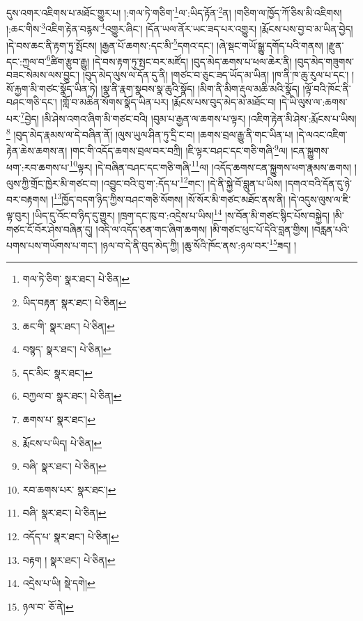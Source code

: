 དུས་འགར་འཇིགས་པ་མཐོང་གྱུར་པ། །:གལ་ཏེ་གཅིག་\footnote{གལ་ཏེ་ཅིག་  སྣར་ཐང་།  པེ་ཅིན། }ལ་:ཡིད་རྟོན་\footnote{ཡིད་བརྟན་  སྣར་ཐང་།  པེ་ཅིན། }ན། །གཅིག་ལ་ཁྱོད་ཀོ་ཅིས་མི་འཇིགས། །:ཆང་གིས་\footnote{ཆང་གི་  སྣར་ཐང་།  པེ་ཅིན། }འཇིག་རྟེན་བརྙས་\footnote{བསྙད་  སྣར་ཐང་།  པེ་ཅིན། }འགྱུར་ཞིང་། །དོན་ཡལ་ནོར་ཡང་ཟད་པར་འགྱུར། །རྨོངས་པས་བྱ་བ་མ་ཡིན་བྱེད། །དེ་བས་ཆང་ནི་རྟག་ཏུ་སྤོངས། །རྒྱན་པོ་ཆགས་:དང་མི་\footnote{དང་མིང་  སྣར་ཐང་། }དགའ་དང་། །ཞེ་སྡང་གཡོ་སྒྱུ་དགོད་པའི་གནས། །རྫུན་དང་:ཀྱལ་བ་\footnote{བཀྱལ་བ་  སྣར་ཐང་།  པེ་ཅིན། }ཚིག་རྩུབ་རྒྱུ། །དེ་བས་རྟག་ཏུ་སྤང་བར་མཛོད། །བུད་མེད་ཆགས་པ་ཕལ་ཆེར་ནི། །བུད་མེད་གཟུགས་བཟང་སེམས་ལས་བྱུང་། །བུད་མེད་ལུས་ལ་དོན་དུ་ནི། །གཙང་བ་ཅུང་ཟད་ཡོད་མ་ཡིན། །ཁ་ནི་ཁ་ཆུ་རུལ་པ་དང་། །སོ་རྐྱག་མི་གཙང་སྣོད་ཡིན་ཏེ། །སྣ་ནི་རྣག་སྣབས་སྣ་ཆུའི་སྣོད། །མིག་ནི་མིག་རྡུལ་མཆི་མའི་སྣོད། །ལྟོ་བའི་ཁོང་ནི་བཤང་གཅི་དང་། །གློ་བ་མཆིན་སོགས་སྣོད་ཡིན་པར། །རྨོངས་པས་བུད་མེད་མ་མཐོང་བ། །དེ་ཡི་ལུས་ལ་:ཆགས་པར་\footnote{ཆགས་པ་  སྣར་ཐང་། }བྱེད། །མི་ཤེས་འགའ་ཞིག་མི་གཙང་བའི། །བུམ་པ་རྒྱན་ལ་ཆགས་པ་ལྟར། །འཇིག་རྟེན་མི་ཤེས་:རྨོངས་པ་ཡིས།\footnote{རྨོངས་པ་ཡིད།  པེ་ཅིན། } །བུད་མེད་རྣམས་ལ་དེ་བཞིན་ནོ། །ལུས་ཡུལ་ཤིན་ཏུ་དྲི་ང་བ། །ཆགས་བྲལ་རྒྱུ་ནི་གང་ཡིན་པ། །དེ་ལའང་འཇིག་རྟེན་ཆེས་ཆགས་ན། །གང་གི་འདོད་ཆགས་བྲལ་བར་བཀྲི། །ཇི་ལྟར་བཤང་དང་གཅི་གཞི་\footnote{བཞི་  སྣར་ཐང་།  པེ་ཅིན། }ལ། །ངན་སྐྱུགས་ཕག་:རབ་ཆགས་པ་\footnote{རབ་ཆགས་པར་  སྣར་ཐང་། }ལྟར། །དེ་བཞིན་བཤང་དང་གཅི་གཞི་\footnote{བཞི་  སྣར་ཐང་།  པེ་ཅིན། }ལ། །འདོད་ཆགས་ངན་སྐྱུགས་ཕག་རྣམས་ཆགས། །ལུས་ཀྱི་གྲོང་ཁྱེར་མི་གཙང་བ། །འབྱུང་བའི་བུ་ག་:དོད་པ་\footnote{འདོད་པ་  སྣར་ཐང་།  པེ་ཅིན། }གང་། །དེ་ནི་སྐྱེ་བོ་བླུན་པ་ཡིས། །དགའ་བའི་དོན་དུ་ཉེ་བར་བརྟགས། །\footnote{བརྟག །  སྣར་ཐང་།  པེ་ཅིན། }ཁྱོད་བདག་ཉིད་ཀྱིས་བཤང་གཅི་སོགས། །སོ་སོར་མི་གཙང་མཐོང་ནས་ནི། །དེ་འདུས་ལུས་ལ་ཇི་ལྟ་བུར། །ཡིད་དུ་འོང་བ་ཉིད་དུ་གྱུར། །ཁྲག་དང་ཁུ་བ་:འདྲེས་པ་ཡིས།\footnote{འདྲེས་པ་ཡི།  སྡེ་དགེ། } །ས་བོན་མི་གཙང་སྙིང་པོས་བསྐྱེད། །མི་གཙང་ངོ་བོར་ཤེས་བཞིན་དུ། །འདི་ལ་འདོད་ཅན་གང་ཞིག་ཆགས། །མི་གཙང་ཕུང་པོ་དེའི་བླན་གྱིས། །བརླན་པའི་པགས་པས་གཡོགས་པ་གང་། །ཉལ་བ་དེ་ནི་བུད་མེད་ཀྱི། །ཆུ་སོའི་ཁོང་ནས་:ཉལ་བར་\footnote{ཉལ་བ་  ཅོ་ནེ། }ཟད། །
